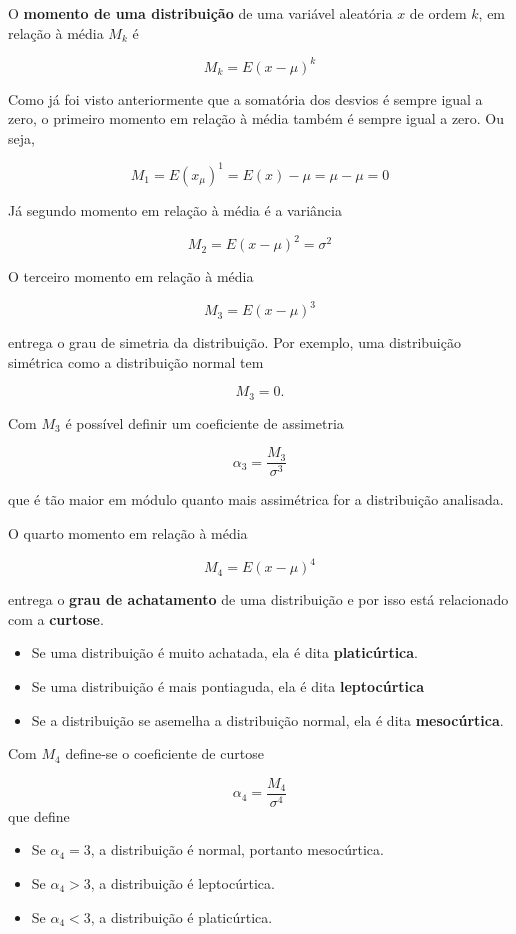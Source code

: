 \documentclass[
]{book}
\providecommand{\tightlist}{%
  \setlength{\itemsep}{0pt}\setlength{\parskip}{0pt}}
\begin{document}
O \textbf{momento de uma distribuição} de uma variável aleatória \(x\) de ordem \(k\), em relação à média \(M_k\) é

\[
  M_k = E(x - \mu)^k
\]

Como já foi visto anteriormente que a somatória dos desvios é sempre igual a zero, o primeiro momento em relação à média também é sempre igual a zero. Ou seja,

\[
  M_1 = E(x _ \mu)^1 = E(x) - \mu = \mu - \mu = 0
\]

Já segundo momento em relação à média é a variância

\[
  M_2 = E(x - \mu)^2 = \sigma^2
\]

O terceiro momento em relação à média

\[
  M_3 = E(x - \mu)^3 
\]

entrega o grau de simetria da distribuição. Por exemplo, uma distribuição simétrica como a distribuição normal tem

\[
M_3 = 0.
\]

Com \(M_3\) é possível definir um coeficiente de assimetria

\[
  \alpha_3 = \dfrac{M_3}{\sigma^3}
\]

que é tão maior em módulo quanto mais assimétrica for a distribuição analisada.

O quarto momento em relação à média

\[
  M_4 = E(x - \mu)^4 
\]

entrega o \textbf{grau de achatamento} de uma distribuição e por isso está relacionado com a \textbf{curtose}.

\begin{itemize}
\tightlist
\item
  Se uma distribuição é muito achatada, ela é dita \textbf{platicúrtica}.
\item
  Se uma distribuição é mais pontiaguda, ela é dita \textbf{leptocúrtica}
\item
  Se a distribuição se asemelha a distribuição normal, ela é dita \textbf{mesocúrtica}.
\end{itemize}

Com \(M_4\) define-se o coeficiente de curtose

\[
  \alpha_4 = \dfrac{M_4}{\sigma^4}
\]
que define

\begin{itemize}
\tightlist
\item
  Se \(\alpha_4 = 3\), a distribuição é normal, portanto mesocúrtica.
\item
  Se \(\alpha_4 > 3\), a distribuição é leptocúrtica.
\item
  Se \(\alpha_4 < 3\), a distribuição é platicúrtica.
\end{itemize}
\end{document}
